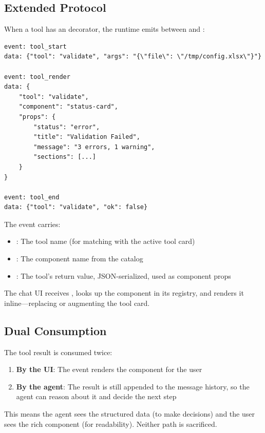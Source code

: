 \subsection{Extended Protocol}

When a tool has an  decorator, the runtime emits  between  and :

\begin{lstlisting}[language={},numbers=none]
event: tool_start
data: {"tool": "validate", "args": "{\"file\": \"/tmp/config.xlsx\"}"}

event: tool_render
data: {
    "tool": "validate",
    "component": "status-card",
    "props": {
        "status": "error",
        "title": "Validation Failed",
        "message": "3 errors, 1 warning",
        "sections": [...]
    }
}

event: tool_end
data: {"tool": "validate", "ok": false}
\end{lstlisting}

The  event carries:
\begin{itemize}
    \item {}: The tool name (for matching with the active tool card)
    \item {}: The component name from the catalog
    \item {}: The tool's return value, JSON-serialized, used as component props
\end{itemize}

The chat UI receives , looks up the component in its registry, and renders it inline---replacing or augmenting the tool card.

\subsection{Dual Consumption}

The tool result is consumed twice:

\begin{enumerate}
    \item \textbf{By the UI}: The  event renders the component for the user
    \item \textbf{By the agent}: The result is still appended to the message history, so the agent can reason about it and decide the next step
\end{enumerate}

This means the agent sees the structured data (to make decisions) and the user sees the rich component (for readability). Neither path is sacrificed.

